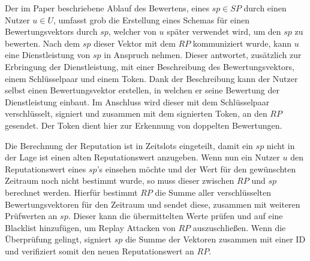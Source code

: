 \documentclass{scrreprt}
\begin{document}
Der im Paper beschriebene Ablauf des Bewertens, eines $sp \in SP$ durch einen Nutzer $u \in U$, umfasst grob die Erstellung eines Schemas für einen Bewertungsvektors durch $sp$, welcher von $u$ später verwendet wird, um den $sp$ zu bewerten. Nach dem $sp$ dieser Vektor mit dem $RP$ kommuniziert wurde, kann $u$ eine Dienstleistung von $sp$ in Anspruch nehmen. Dieser antwortet, zusätzlich zur Erbringung der Dienstleistung, mit einer Beschreibung des Bewertungsvektors, einem Schlüsselpaar und einem Token. Dank der Beschreibung kann der Nutzer selbst einen Bewertungsvektor erstellen, in welchen er seine Bewertung der Dienstleistung einbaut. Im Anschluss wird dieser mit dem Schlüsselpaar verschlüsselt, signiert und zusammen mit dem signierten Token, an den $RP$ gesendet. Der Token dient hier zur Erkennung von doppelten Bewertungen. 

Die Berechnung der Reputation ist in Zeitslots eingeteilt, damit ein $sp$ nicht in der Lage ist einen alten Reputationswert anzugeben. Wenn nun ein Nutzer $u$ den Reputationswert eines $sp$'s einsehen möchte und der Wert für den gewünschten Zeitraum noch nicht bestimmt wurde, so muss dieser zwischen $RP$ und $sp$ berechnet werden. Hierfür bestimmt $RP$ die Summe aller verschlüsselten Bewertungsvektoren für den Zeitraum und sendet diese, zusammen mit weiteren Prüfwerten an $sp$. Dieser kann die übermittelten Werte prüfen und auf eine Blacklist hinzufügen, um Replay Attacken von $RP$ auszuschließen. Wenn die Überprüfung gelingt, signiert $sp$ die Summe der Vektoren zusammen mit einer ID und verifiziert somit den neuen Reputationswert an $RP$. 
\end{document}
